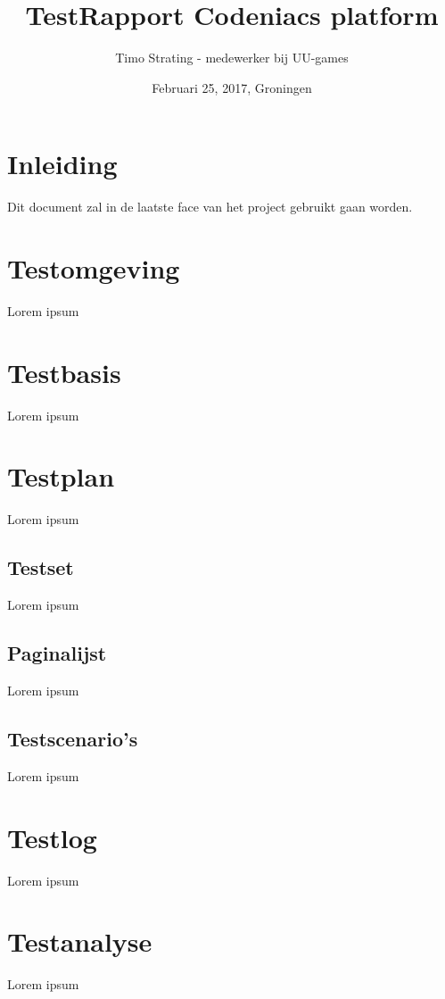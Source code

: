 \documentclass[]{report}
\title{TestRapport Codeniacs platform}
\author{Timo Strating - medewerker bij UU-games}
\date{Februari 25, 2017, Groningen}
\begin{document}
\maketitle

\tableofcontents
\newpage






\chapter{Inleiding}

Dit document zal in de laatste face van het project gebruikt gaan worden.



\chapter{Testomgeving}

Lorem ipsum



\chapter{Testbasis}

Lorem ipsum



\chapter{Testplan}

Lorem ipsum

\section{Testset}
Lorem ipsum

\section{Paginalijst}
Lorem ipsum

\section{Testscenario's}
Lorem ipsum



\chapter{Testlog}

Lorem ipsum




\chapter{Testanalyse}

Lorem ipsum
\end{document}
